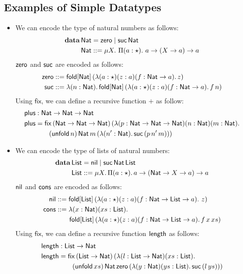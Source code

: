 \subsection{Examples of Simple Datatypes}

\begin{itemize}

\item We can encode the type of natural numbers as follows:
  \begin{align*}
    \data\,\Nat &= \zero \mid \suc\,\Nat \\
    \Nat &::= \mu X.\ \Pi(a : \star).\ a \rightarrow (X \rightarrow a) \rightarrow a    
  \end{align*}
  $\zero$ and $\suc$ are encoded as follows:
  \begin{align*}
    \zero &::= \fold{\Nat}{(\lambda (a : \star) (z : a) (f : \Nat \rightarrow a).\,z)}\\
    \suc &::= \lambda (n : \Nat).\,\fold{\Nat}{(\lambda (a : \star) (z : a) (f : \Nat \rightarrow a).\,f\,n)}
  \end{align*}
  Using $\mathsf{fix}$, we can define a recursive function $\plus$ as
  follow:
  \begin{align*}
    \plus &:\PlFunc\\
    \plus &=\mathsf{fix}\,(\PlFunc)\,(\lambda(p : \PlFunc)(n : \Nat)(m : \Nat).\\
          &\qquad (\unfold[\Nat]{n})\,\Nat\,m\,(\lambda (n^{\prime} : \Nat).\,\suc\,(p\,n^{\prime}\,m)))
  \end{align*}
\item We can encode the type of lists of natural numbers:
  \begin{align*}
    \data\,\List &= \nil \mid \suc\,\Nat\,\List \\
    \List &::= \mu X.\,\Pi(a : \star).\,a \rightarrow (\Nat \rightarrow X \rightarrow a) \rightarrow a    
  \end{align*}
  $\nil$ and $\cons$ are encoded as follows:
  \begin{align*}
    \nil &::= \fold{\List}{(\lambda (a : \star) (z : a) (f : \Nat \rightarrow \List \rightarrow a).\ z)}\\
    \cons &::= \lambda(x : \Nat)(xs : \List).\\
         &\qquad \fold{\List}{(\lambda(a : \star)(z : a)(f : \Nat\rightarrow \List \rightarrow a).\,f\,x\,xs)}
  \end{align*}
  Using $\mathsf{fix}$, we can define a recursive function $\length$
  as follows:
  \begin{align*}
    \length &: \List \rightarrow \Nat\\
    \length &= \mathsf{fix}\,(\List \rightarrow \Nat)\,(\lambda(l : \List
              \rightarrow \Nat)(xs : \List).\\
            &\qquad (\unfold[\List]{xs})\,\Nat\,\zero\,(\lambda(y : \Nat)(ys : \List).\,\suc\,(l\,ys)))
  \end{align*}
\end{itemize}

